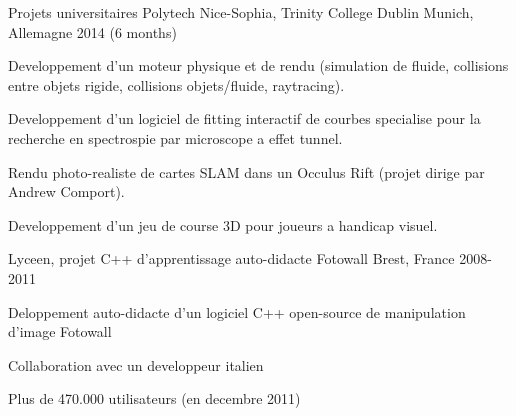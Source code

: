 \begin{cventries}
  \cventry
    {Projets universitaires} %
    {Polytech Nice-Sophia, Trinity College Dublin} %
    {Munich, Allemagne} %
    {2014 (6 months)} %
    {
      \begin{cvitems} %
        \item Developpement d'un moteur physique et de rendu (simulation de fluide, collisions entre objets rigide, collisions objets/fluide, raytracing).
        \item Developpement d'un logiciel de fitting interactif de courbes specialise pour la recherche en spectrospie par microscope a effet tunnel. 
        \item Rendu photo-realiste de cartes SLAM dans un Occulus Rift (projet dirige par Andrew Comport).
        \item Developpement d'un jeu de course 3D pour joueurs a handicap visuel. 
      \end{cvitems}
    }

  \cventry
    {Lyceen, projet C++ d'apprentissage auto-didacte} %
    {Fotowall} %
    {Brest, France} %
    {2008-2011} %
    {
      \begin{cvitems} %
        \item Deloppement auto-didacte d'un logiciel C++ open-source de manipulation d'image Fotowall
        \item Collaboration avec un developpeur italien
        \item Plus de 470.000 utilisateurs (en decembre 2011)
      \end{cvitems}
    }

\end{cventries}

